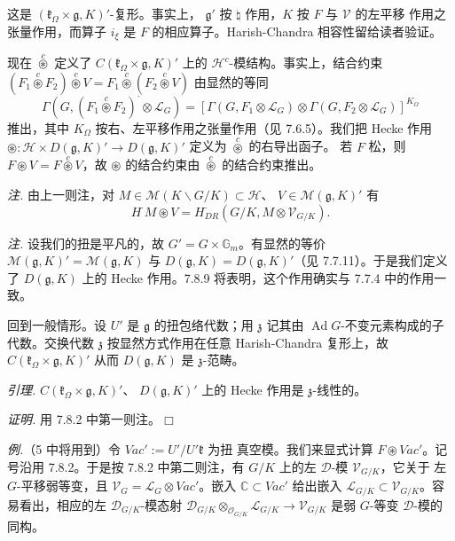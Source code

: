 这是 $(\mathfrak{k}_\Omega\times\mathfrak{g},K)'$-复形。事实上，
$\mathfrak{g}'$ 按 $\natural$ 作用，$K$ 按 $F$ 与 $\mathcal{V}$ 的左平移
作用之张量作用，而算子 $i_\xi$ 是 $F$ 的相应算子。Harish-Chandra
相容性留给读者验证。

现在 $\overset{c}{\circledast}$ 定义了
$C(\mathfrak{k}_\Omega\times\mathfrak{g},K)'$ 上的
$\mathcal{H}^c$-模结构。事实上，结合约束
$(F_1\overset{c}{\circledast}F_2)\overset{c}{\circledast}V=
F_1\overset{c}{\circledast}(F_2\overset{c}{\circledast}V)$ 由显然的等同
\[
\Gamma(G,(F_1\overset{c}{\circledast}F_2)^{\cdot}\otimes\mathcal{L}_G)
=[\Gamma(G,F_1^{\cdot}\otimes\mathcal{L}_G)
\otimes\Gamma(G,F_2^{\cdot}\otimes\mathcal{L}_G)]^{K_\Omega}
\]
推出，其中 $K_\Omega$ 按右、左平移作用之张量作用（见 7.6.5）。我们把
Hecke 作用 $\circledast:\mathcal{H}\times D(\mathfrak{g},K)'\to
D(\mathfrak{g},K)'$ 定义为 $\overset{c}{\circledast}$ 的右导出函子。
若 $F$ 松，则 $F\circledast V=F\overset{c}{\circledast}V$，故
$\circledast$ 的结合约束由 $\overset{c}{\circledast}$ 的结合约束推出。

\emph{注.} 由上一则注，对
$M\in\mathcal{M}(K\backslash G/K)\subset\mathcal{H}$、
$V\in\mathcal{M}(\mathfrak{g},K)'$ 有
\begin{equation}\tag{332}
H^{\cdot}M\circledast V
=H_{DR}^{\cdot}(G/K,M\otimes\mathcal{V}_{G/K}).
\end{equation}

 \emph{注.} 设我们的扭是平凡的，故
$G'=G\times\mathbb{G}_m$。有显然的等价
$\mathcal{M}(\mathfrak{g},K)'=\mathcal{M}(\mathfrak{g},K)$ 与
$D(\mathfrak{g},K)=D(\mathfrak{g},K)'$（见 7.7.11）。于是我们定义了
$D(\mathfrak{g},K)$ 上的 Hecke 作用。7.8.9 将表明，这个作用确实与
7.7.4 中的作用一致。

回到一般情形。设 $U'$ 是 $\mathfrak{g}$ 的扭包络代数；用 $\mathfrak{z}$
记其由 $\operatorname{Ad}G$-不变元素构成的子代数。交换代数 $\mathfrak{z}$
按显然方式作用在任意 Harish-Chandra 复形上，故
$C(\mathfrak{k}_\Omega\times\mathfrak{g},K)'$ 从而 $D(\mathfrak{g},K)$
是 $\mathfrak{z}$-范畴。


 \emph{引理.} $C(\mathfrak{k}_\Omega\times\mathfrak{g},K)'$、
$D(\mathfrak{g},K)'$ 上的 Hecke 作用是 $\mathfrak{z}$-线性的。

\emph{证明.} 用 7.8.2 中第一则注。\hfill$\Box$

 \emph{例.}（5 中将用到）令 $Vac':=U'/U'\mathfrak{k}$ 为扭
真空模。我们来显式计算 $F\circledast Vac'$。记号沿用 7.8.2。于是按 7.8.2
中第二则注，有 $G/K$ 上的左 $\mathcal{D}$-模 $\mathcal{V}_{G/K}$，它关于
左 $G$-平移弱等变，且 $\mathcal{V}_G=\mathcal{L}_G\otimes Vac'$。嵌入
$\mathbb{C}\subset Vac'$ 给出嵌入
$\mathcal{L}_{G/K}\subset\mathcal{V}_{G/K}$。容易看出，相应的左
$\mathcal{D}_{G/K}$-模态射 $\mathcal{D}_{G/K}
\otimes_{\mathcal{O}_{G/K}}\mathcal{L}_{G/K}\to\mathcal{V}_{G/K}$
是弱 $G$-等变 $\mathcal{D}$-模的同构。

